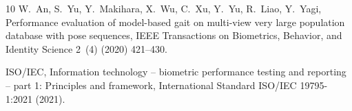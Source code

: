\documentclass[review,12pt]{elsarticle}
\begin{document}
\begin{thebibliography}{10}
W.~An, S.~Yu, Y.~Makihara, X.~Wu, C.~Xu, Y.~Yu, R.~Liao, Y.~Yagi, Performance
  evaluation of model-based gait on multi-view very large population database
  with pose sequences, IEEE Transactions on Biometrics, Behavior, and Identity
  Science 2~(4) (2020) 421--430.

{ISO/IEC}, Information technology -- biometric performance testing and
  reporting -- part 1: Principles and framework, International Standard ISO/IEC
  19795-1:2021 (2021).

\end{thebibliography}
\end{document}
